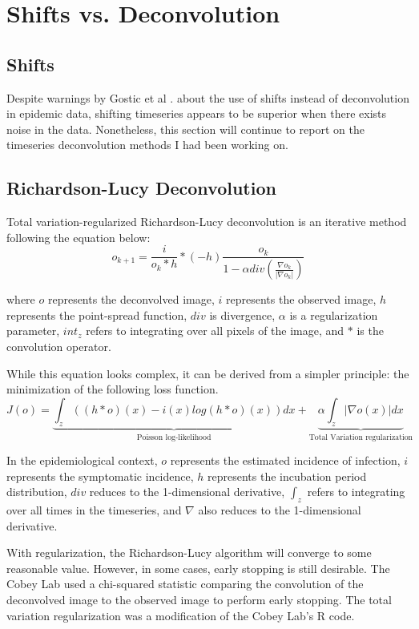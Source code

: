 \documentclass{article}
\begin{document}
\section{Shifts vs. Deconvolution}

\subsection{Shifts}
Despite warnings by Gostic et al \cite{Gostic}. about the use of shifts instead of deconvolution in epidemic data, shifting timeseries appears to be superior when there exists noise in the data. Nonetheless, this section will continue to report on the timeseries deconvolution methods I had been working on.


\subsection{Richardson-Lucy Deconvolution}
Total variation-regularized Richardson-Lucy deconvolution is an iterative method following the equation below: \cite{RLLoss}
\begin{equation}
    o_{k+1} = \frac{i}{o_k * h} * (-h) \frac{o_k}{1-\alpha div(\frac{\nabla o_k}{|\nabla o_k|})}
\end{equation}

where $o$ represents the deconvolved image, $i$ represents the observed image, $h$ represents the point-spread function, $div$ is divergence, $\alpha$ is a regularization parameter, $int_z$ refers to integrating over all pixels of the image, and $*$ is the convolution operator.

While this equation looks complex, it can be derived from a simpler principle: the minimization of the following loss function. 
\begin{equation}
    J(o) = \underbrace{\int_z ((h*o)(x) - i(x) log(h*o)(x))dx}_{\mbox{Poisson log-likelihood}} + \underbrace{\alpha \int_z |\nabla o(x)| dx}_{\mbox{Total Variation regularization}}
\end{equation}


In the epidemiological context, $o$ represents the estimated incidence of infection, $i$ represents the symptomatic incidence, $h$ represents the incubation period distribution, $div$ reduces to the 1-dimensional derivative,  $\int_z$ refers to integrating over all times in the timeseries, and $\nabla$ also reduces to the 1-dimensional derivative.

With regularization, the Richardson-Lucy algorithm will converge to some reasonable value. However, in some cases, early stopping is still desirable. The Cobey Lab used a chi-squared statistic comparing the convolution of the deconvolved image to the observed image to perform early stopping. The total variation regularization was a modification of the Cobey Lab's R code.
\end{document}
